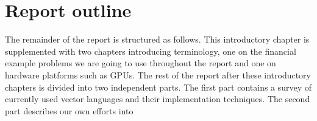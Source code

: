 %
%


\section{Report outline}
The remainder of the report is structured as follows. This
introductory chapter is supplemented with two chapters introducing
terminology, one on the financial example problems we are going to use
throughout the report and one on hardware platforms such as GPUs. The
rest of the report after these introductory chapters is divided into
two independent parts. The first part contains a survey of currently
used vector languages and their implementation techniques. The second
part describes our own efforts into \todo{\ldots}

